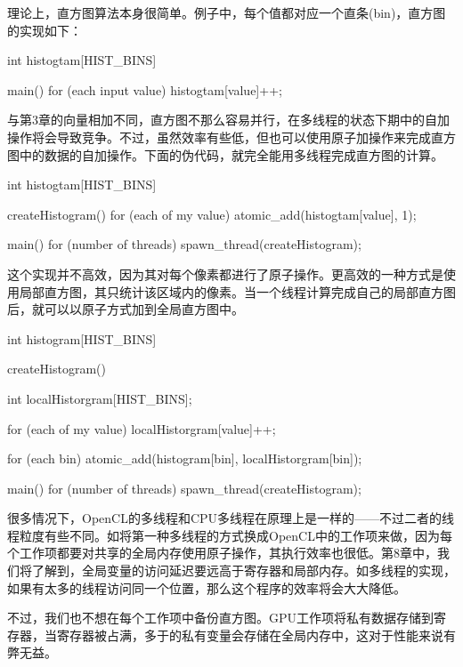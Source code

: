 
理论上，直方图算法本身很简单。例子中，每个值都对应一个直条(bin)，直方图的实现如下：

\begin{codebox}[cpp]
int histogtam[HIST_BINS]

main(){
  for (each input value){
    histogtam[value]++;
  }
}
\end{codebox}

与第3章的向量相加不同，直方图不那么容易并行，在多线程的状态下期中的自加操作将会导致竞争。不过，虽然效率有些低，但也可以使用原子加操作来完成直方图中的数据的自加操作。下面的伪代码，就完全能用多线程完成直方图的计算。

\begin{codebox}[cpp]
int histogtam[HIST_BINS]

createHistogram(){
  for (each of my value){
    atomic_add(histogtam[value], 1);
  }
}

main(){
  for (number of threads){
    spawn_thread(createHistogram);
  }
}
\end{codebox}

这个实现并不高效，因为其对每个像素都进行了原子操作。更高效的一种方式是使用局部直方图，其只统计该区域内的像素。当一个线程计算完成自己的局部直方图后，就可以以原子方式加到全局直方图中。

\begin{codebox}[cpp]
int histogram[HIST_BINS]

createHistogram(){

  int localHistorgram[HIST_BINS];

  for (each of my value){
    localHistorgram[value]++;
  }

  for (each bin){
    atomic_add(histogram[bin], localHistorgram[bin]);
  }
}

main(){
  for (number of threads){
    spawn_thread(createHistogram);
  }
}
\end{codebox}

很多情况下，OpenCL的多线程和CPU多线程在原理上是一样的——不过二者的线程粒度有些不同。如将第一种多线程的方式换成OpenCL中的工作项来做，因为每个工作项都要对共享的全局内存使用原子操作，其执行效率也很低。第8章中，我们将了解到，全局变量的访问延迟要远高于寄存器和局部内存。如多线程的实现，如果有太多的线程访问同一个位置，那么这个程序的效率将会大大降低。

不过，我们也不想在每个工作项中备份直方图。GPU工作项将私有数据存储到寄存器，当寄存器被占满，多于的私有变量会存储在全局内存中，这对于性能来说有弊无益。

